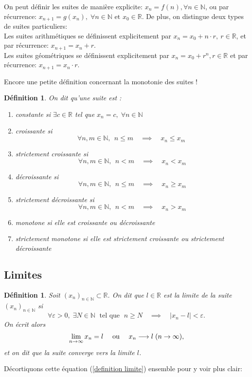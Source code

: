 \documentclass[a4paper, 12pt, french, twoside]{article}
\newtheorem{defi}[theorem]{Définition}
\newcommand{\Nn}{{\mathbb{N}}}
\newcommand{\Rr}{{\mathbb{R}}}
\begin{document}
On peut définir les suites de manière explicite: 
$x_n=f(n), \forall n\in\Nn$, ou par récurrence:
$ x_{n+1}=g(x_n), \; \forall n \in \Nn \text{ et } x_0 \in \Rr$.
De plus, on distingue deux types de suites particuliers:
\\Les suites arithmétiques se définissent explicitement par $x_n=x_0+n\cdot r, ~r\in\Rr$, et par récurrence: $x_{n+1}=x_n+r$.
\\Les suites géométriques se définissent explicitement par 
$x_n=x_0+r^n, r\in\Rr$ et par récurrence: $x_{n+1}=x_n\cdot r$.



Encore une petite définition concernant la monotonie des suites !


\begin{defi}
    On dit qu'une suite est :
    \begin{enumerate}
        \item constante si $\exists c\in \Rr $ tel que $x_n=c, \; \forall n \in \Nn $
        \item croissante si
        \[\forall n,m \in \Nn, ~~n\leq m\quad\implies\quad x_n\leq x_m \;  \]
        \item strictement croissante si
        \[\forall n,m \in \Nn, ~~n< m\quad\implies\quad x_n< x_m \]
        \item décroissante si
        \[\forall n,m \in \Nn, ~~n\leq m\quad\implies\quad x_n\geq x_m\]
        \item strictement décroissante si
        \[\forall n,m \in \Nn, ~~n< m\quad\implies\quad x_n> x_m \]
        \item monotone si elle est croissante ou décroissante
        \item strictement monotone si elle est strictement croissante ou strictement décroissante
    \end{enumerate}
\end{defi}

\subsection{Limites}
\begin{defi}
Soit $(x_n)_{n\in\Nn}\subset \Rr$. On dit que $l\in \Rr$ est la \textit{limite} de la suite  $(x_n)_{n\in\Nn}$ si 
\begin{equation}\label{definition limite}
    \forall \varepsilon>0, \; \exists N\in\Nn \; \text{ tel que } \; n\geq N \quad \implies \quad |x_n-l|<\varepsilon.
\end{equation}
On écrit alors 
\begin{equation*}
    \lim_{n\to\infty} x_n= l \text{ \quad ou \quad } x_n\longrightarrow l \; (n \rightarrow \infty),
\end{equation*}
et on dit que la suite \textit{converge} vers la limite $l$.     
\end{defi}
Décortiquons cette équation (\ref{definition limite}) ensemble pour y voir plus clair: 
\end{document}
